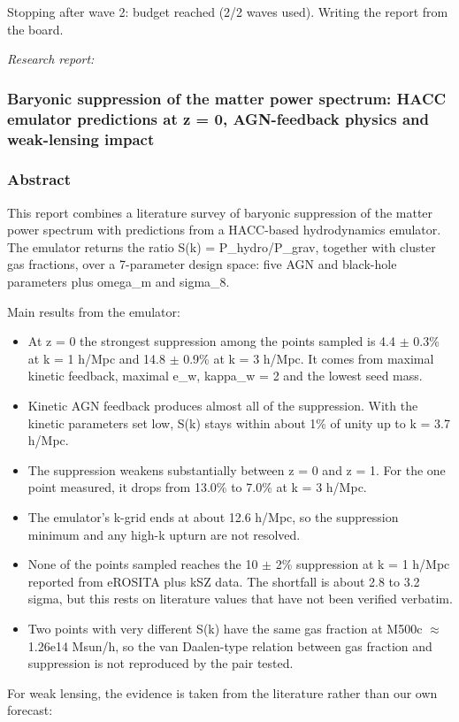 \documentclass[11pt,a4paper]{article}
\begin{document}
Stopping after wave 2: budget reached (2/2 waves used). Writing the report from the board.

\textit{Research report:}\par
\subsubsection*{Baryonic suppression of the matter power spectrum: HACC emulator predictions at z = 0, AGN-feedback physics and weak-lensing impact}
\subsubsection*{Abstract}
This report combines a literature survey of baryonic suppression of the matter power spectrum with predictions from a HACC-based hydrodynamics emulator. The emulator returns the ratio S(k) = P\_hydro/P\_grav, together with cluster gas fractions, over a 7-parameter design space: five AGN and black-hole parameters plus omega\_m and sigma\_8.

Main results from the emulator:

\begin{itemize}
  \item At z = 0 the strongest suppression among the points sampled is 4.4 $\pm$ 0.3\% at k = 1 h/Mpc and 14.8 $\pm$ 0.9\% at k = 3 h/Mpc. It comes from maximal kinetic feedback, maximal e\_w, kappa\_w = 2 and the lowest seed mass.
  \item Kinetic AGN feedback produces almost all of the suppression. With the kinetic parameters set low, S(k) stays within about 1\% of unity up to k = 3.7 h/Mpc.
  \item The suppression weakens substantially between z = 0 and z = 1. For the one point measured, it drops from 13.0\% to 7.0\% at k = 3 h/Mpc.
  \item The emulator's k-grid ends at about 12.6 h/Mpc, so the suppression minimum and any high-k upturn are not resolved.
  \item None of the points sampled reaches the 10 $\pm$ 2\% suppression at k = 1 h/Mpc reported from eROSITA plus kSZ data. The shortfall is about 2.8 to 3.2 sigma, but this rests on literature values that have not been verified verbatim.
  \item Two points with very different S(k) have the same gas fraction at M500c $\approx$ 1.26e14 Msun/h, so the van Daalen-type relation between gas fraction and suppression is not reproduced by the pair tested.
\end{itemize}
For weak lensing, the evidence is taken from the literature rather than our own forecast:
\end{document}
